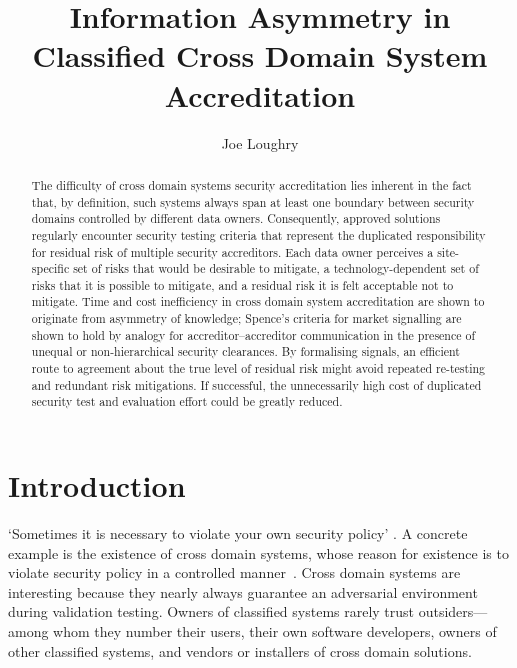 \documentclass{llncs}
\begin{document}
\title{Information Asymmetry in Classified Cross Domain System Accreditation}
\author{Joe Loughry}

\maketitle

\begin{abstract}
The difficulty of cross domain systems security accreditation lies
inherent in the fact that, by definition, such systems always span at least
one boundary between security domains controlled by different data
owners. Consequently, approved solutions regularly encounter security
testing criteria that represent the duplicated responsibility for
residual risk of multiple security accreditors.  Each data owner perceives a
site-specific set of risks that would be desirable to mitigate,
a technology-dependent set of risks that it is possible to mitigate,
and a residual risk it is
felt acceptable not to mitigate.  Time and cost inefficiency in cross
domain system accreditation are shown to originate from asymmetry
of knowledge; Spence's criteria for market signalling are
shown to hold by analogy for accreditor--accreditor communication in the
presence of unequal or non-hierarchical security clearances.
By formalising signals, an efficient route to agreement about the true
level of residual risk might avoid repeated re-testing and redundant
risk mitigations.  If successful, the unnecessarily high cost of duplicated
security test and evaluation effort could be greatly reduced.
\end{abstract}


\section{Introduction}

`Sometimes it is necessary to violate your own security policy' \cite{Loughry2012b}.
A concrete example is the existence of cross domain systems,
whose reason for existence is to violate security policy in a controlled
manner~\cite{DCID-6/3a}.
Cross domain systems are interesting because they nearly always guarantee an adversarial
environment during validation testing.  Owners of classified
systems rarely trust outsiders---among whom
they number their users, their own software developers, owners of other
classified systems, and vendors or installers of cross domain solutions.
\end{document}
